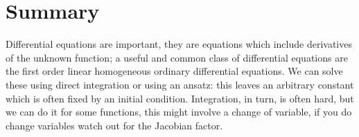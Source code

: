 \documentclass[12pt]{article}
\begin{document}
\section*{Summary}

Differential equations are important, they are equations which include
derivatives of the unknown function; a useful and common class of
differential equations are the first order linear homogeneous ordinary
differential equations. We can solve these using direct integration or
using an ansatz: this leaves an arbitrary constant which is often
fixed by an initial condition. Integration, in turn, is often hard,
but we can do it for some functions, this might involve a change of
variable, if you do change variables watch out for the Jacobian
factor.
  
\end{document}
